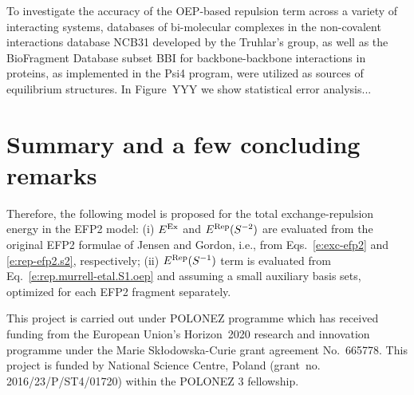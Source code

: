 To investigate the accuracy of the OEP\hyp{}based repulsion
term across
a variety of
interacting systems, databases
of bi\hyp{}molecular complexes in the non\hyp{}covalent
interactions database NCB31 developed by the Truhlar's 
group,\cite{Zhao.Schultz.Truhlar.JCTC.2006,
Zhao.Truhlar.JCTC.2005,Zhao.Schultz.Truhlar.JCTC.2006,Zhao.Schultz.Truhlar.JCP.2005}
as well as the BioFragment Database subset BBI for backbone\hyp{}backbone
interactions in proteins,\cite{Burns.Faver.Zheng.Marshall.Smith.Vanommeslaeghe.MacKerell.Merz.Sherrill.JCP.2017} 
as implemented in the {\sc Psi4}
program,\cite{Psi4.JCTC.2017}
were utilized as sources of equilibrium structures. 
In Figure~YYY we show statistical error analysis...






\section{\label{s:6.conclusions}Summary and a few concluding remarks}

Therefore, the following model is proposed for the
total exchange\hyp{}repulsion energy in the EFP2 model: 
(i) $E^{\rm Ex}$ and $E^{\rm Rep}(S^{-2})$ are evaluated
from the original EFP2 formulae of Jensen and Gordon, i.e.,
from Eqs.~\eqref{e:exc-efp2} and \eqref{e:rep-efp2.s2}, respectively;
(ii) $E^{\rm Rep}(S^{-1})$ term is evaluated from Eq.~\eqref{e:rep.murrell-etal.S1.oep}
and assuming a small auxiliary basis sets, optimized for each
EFP2 fragment separately.




\begin{acknowledgments}
This project is carried out under POLONEZ programme which has received funding from the European Union's
Horizon~2020 research and innovation programme under the Marie Sk{\l}odowska-Curie grant agreement 
No.~665778. This project is funded by National Science Centre, Poland 
(grant~no. 2016/23/P/ST4/01720) within the POLONEZ 3 fellowship.
\end{acknowledgments}






